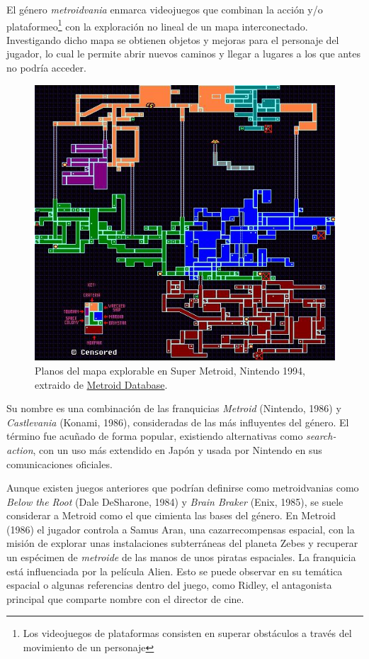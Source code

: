El género \textit{metroidvania} enmarca videojuegos que combinan la acción y/o plataformeo\footnote{Los videojuegos de plataformas consisten en superar obstáculos a través del movimiento de un personaje} con la exploración no lineal de un mapa interconectado. Investigando dicho mapa se obtienen objetos y mejoras para el personaje del jugador, lo cual le permite abrir nuevos caminos y llegar a lugares a los que antes no podría acceder.

\begin{figure}[h]
    \centering
    \includegraphics[scale=2.0]{img/smetrmap.jpg}
    \caption[Planos del mapa explorable en Super Metroid]{Planos del mapa explorable en Super Metroid, Nintendo 1994, extraido de \href{https://metroiddatabase.com/maps/}{Metroid Database}.}
    \label{fig:supermetroidmap}
\end{figure}

Su nombre es una combinación de las franquicias \textit{Metroid} (Nintendo, 1986) y \textit{Castlevania} (Konami, 1986), consideradas de las más influyentes del género. El término fue acuñado de forma popular, existiendo alternativas como \textit{search-action}, con un uso más extendido en Japón y usada por Nintendo en sus comunicaciones oficiales.

Aunque existen juegos anteriores que podrían definirse como metroidvanias como \textit{Below the Root} (Dale DeSharone, 1984) y \textit{Brain Braker} (Enix, 1985), se suele considerar a Metroid como el que cimienta las bases del género. En Metroid (1986) el jugador controla a Samus Aran, una cazarrecompensas espacial, con la misión de explorar unas instalaciones subterráneas del planeta Zebes y recuperar un espécimen de \textit{metroide} de las manos de unos piratas espaciales. La franquicia está influenciada por la película Alien. Esto se puede observar en su temática espacial o algunas referencias dentro del juego, como Ridley, el antagonista principal que comparte nombre con el director de cine.

